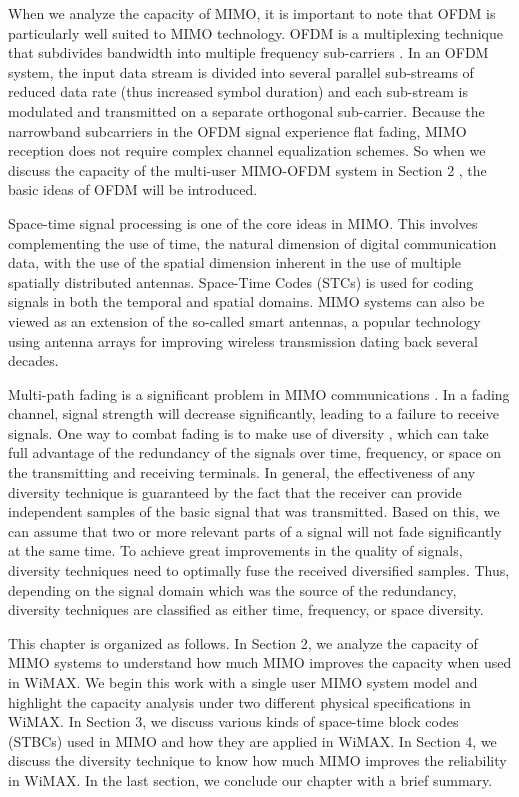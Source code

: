 When we analyze the capacity of MIMO, it is important to note that
OFDM is particularly well suited to MIMO technology. OFDM is a
multiplexing technique that subdivides bandwidth into multiple
frequency sub-carriers \cite{8}. In an OFDM system, the input data
stream is divided into several parallel sub-streams of reduced data
rate (thus increased symbol duration) and each sub-stream is
modulated and transmitted on a separate orthogonal sub-carrier.
Because the narrowband subcarriers in the OFDM signal experience
flat fading, MIMO reception does not require complex channel
equalization schemes. So when we discuss the capacity of the
multi-user MIMO-OFDM system in Section 2 , the basic ideas of OFDM
will be introduced.

Space-time signal processing \cite{29} is one of the core ideas in
MIMO. This involves complementing the use of time, the natural
dimension of digital communication data, with the use of the spatial
dimension inherent in the use of multiple spatially distributed
antennas. Space-Time Codes (STCs) \cite{5} is used for coding
signals in both the temporal and spatial domains. MIMO systems can
also be viewed as an extension of the so-called smart antennas, a
popular technology using antenna arrays for improving wireless
transmission dating back several decades.

Multi-path fading is a significant problem in MIMO communications
\cite{10}. In a fading channel, signal strength will decrease
significantly, leading to a failure to receive signals. One way to
combat fading is to make use of diversity \cite{11}, which can take
full advantage of the redundancy of the signals over time,
frequency, or space on the transmitting and receiving terminals. In
general, the effectiveness of any diversity technique is guaranteed
by the fact that the receiver can provide independent samples of the
basic signal that was transmitted. Based on this, we can assume that
two or more relevant parts of a signal will not fade significantly
at the same time. To achieve great improvements in the quality of
signals, diversity techniques need to optimally fuse the received
diversified samples. Thus, depending on the signal domain which was
the source of the redundancy, diversity techniques are classified as
either time, frequency, or space diversity.

This chapter is organized as follows. In Section 2, we analyze the
capacity of MIMO systems to understand how much MIMO improves the
capacity when used in WiMAX. We begin this work with a single user
MIMO system model and highlight the capacity analysis under two
different physical specifications in WiMAX. In Section 3, we discuss
various kinds of space-time block codes (STBCs) used in MIMO and how
they are applied in WiMAX. In Section 4, we discuss the diversity
technique to know how much MIMO improves the reliability in WiMAX.
In the last section, we conclude our chapter with a brief summary.

